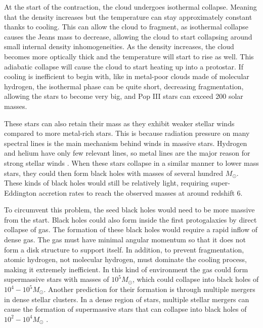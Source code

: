 \documentclass[english, oneside]{HYgradu}
\begin{document}
At the start of the contraction, the cloud undergoes isothermal collapse. Meaning that the density increases but the temperature can stay approximately constant thanks to cooling. This can allow the cloud to fragment, as isothermal collapse causes the Jeans mass to decrease, allowing the cloud to start collapsing around small internal density inhomogeneities. As the density increases, the cloud becomes more optically thick and the temperature will start to rise as well. This adiabatic collapse will cause the cloud to start heating up into a protostar. If cooling is inefficient to begin with, like in metal-poor clouds made of molecular hydrogen, the isothermal phase can be quite short, decreasing fragmentation, allowing the stars to become very big, and Pop III stars can exceed 200 solar masses.

These stars can also retain their mass as they exhibit weaker stellar winds compared to more metal-rich stars. This is because radiation pressure on many spectral lines is the main mechanism behind winds in massive stars. Hydrogen and helium have only few relevant lines, so metal lines are the major reason for strong stellar winds \citep{vink:2001}. When these stars collapse in a similar manner to lower mass stars, they could then form black holes with masses of several hundred $M_\odot$. These kinds of black holes would still be relatively light, requiring super-Eddington accretion rates to reach the observed masses at around redshift 6.

To circumvent this problem, the seed black holes would need to be more massive from the start. Black holes could also form inside the first protogalaxies by direct collapse of gas. The formation of these black holes would require a rapid inflow of dense gas. The gas must have minimal angular momentum so that it does not form a disk structure to support itself. In addition, to prevent fragmentation, atomic hydrogen, not molecular hydrogen, must dominate the cooling process, making it extremely inefficient. In this kind of environment the gas could form supermassive stars with masses of $10^5 M_\odot$, which could collapse into black holes of $10^4 - 10^5 M_\odot$. Another prediction for their formation is through multiple mergers in dense stellar clusters. In a dense region of stars, multiple stellar mergers can cause the formation of supermassive stars that can collapse into black holes of $10^2 - 10^4 M_\odot$ \citep{mezcua:2017}.
\end{document}
